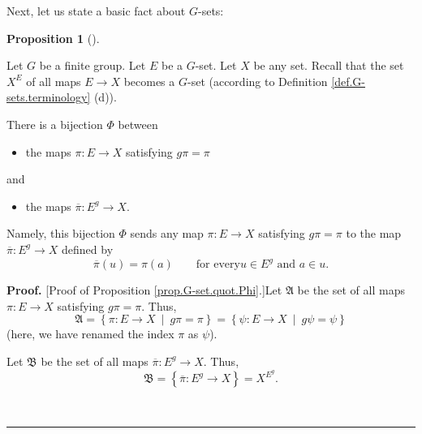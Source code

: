 \documentclass[numbers=enddot,12pt,final,onecolumn,notitlepage,abstracton]{scrartcl}
\theoremstyle{definition}
\newtheorem{prop}[theo]{Proposition}
\newenvironment{proposition}[1][]
{\begin{prop}[#1]\begin{leftbar}}
{\end{leftbar}\end{prop}}
\newenvironment{proof}[1][Proof]{\noindent\textbf{#1.} }{\ \rule{0.5em}{0.5em}}
\newenvironment{verlong}{}{}
\begin{document}
\begin{verlong}
Next, let us state a basic fact about $G$-sets:

\begin{proposition}
\label{prop.G-set.quot.Phi}Let $G$ be a finite group. Let $E$ be a $G$-set.
Let $X$ be any set. Recall that the set $X^{E}$ of all maps $E\rightarrow X$
becomes a $G$-set (according to Definition \ref{def.G-sets.terminology} (d)).

There is a bijection $\Phi$ between

\begin{itemize}
\item the maps $\pi:E\rightarrow X$ satisfying $g\pi=\pi$
\end{itemize}

and

\begin{itemize}
\item the maps $\overline{\pi}:E^{g}\rightarrow X$.
\end{itemize}

Namely, this bijection $\Phi$ sends any map $\pi:E\rightarrow X$ satisfying
$g\pi=\pi$ to the map $\overline{\pi}:E^{g}\rightarrow X$ defined by
\[
\overline{\pi}\left(  u\right)  =\pi\left(  a\right)  \qquad\text{for every
}u\in E^{g}\text{ and }a\in u.
\]

\end{proposition}

\begin{proof}
[Proof of Proposition \ref{prop.G-set.quot.Phi}.]Let $\mathfrak{A}$ be the set
of all maps $\pi:E\rightarrow X$ satisfying $g\pi=\pi$. Thus,%
\[
\mathfrak{A}=\left\{  \pi:E\rightarrow X\ \mid\ g\pi=\pi\right\}  =\left\{
\psi:E\rightarrow X\ \mid\ g\psi=\psi\right\}
\]
(here, we have renamed the index $\pi$ as $\psi$).

Let $\mathfrak{B}$ be the set of all maps $\overline{\pi}:E^{g}\rightarrow X$.
Thus,%
\[
\mathfrak{B}=\left\{  \overline{\pi}:E^{g}\rightarrow X\right\}  =X^{E^{g}}.
\]



\end{proof}
\end{verlong}
\end{document}
